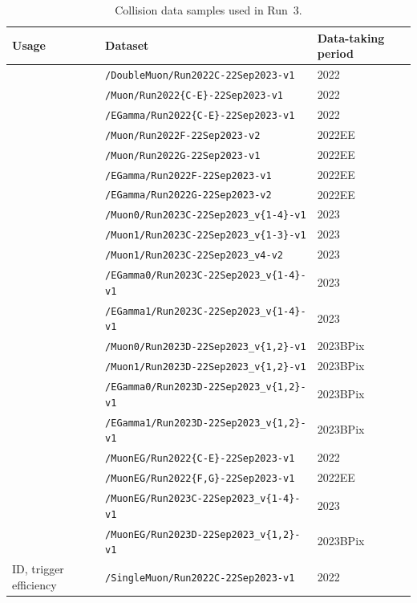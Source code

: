 \begin{table}
\centering
\footnotesize
\caption{Collision data samples used in Run~3.}
\label{tab:app_datasets_run3}
\begin{tabular}{p{3.1cm}p{11.3cm}p{2.8cm}}
\hline\hline
Usage & Dataset & Data-taking period \\
\hline
{}
& \texttt{/DoubleMuon/Run2022C-22Sep2023-v1} & 2022 \\
& \texttt{/Muon/Run2022\{C-E\}-22Sep2023-v1} & 2022 \\
& \texttt{/EGamma/Run2022\{C-E\}-22Sep2023-v1} & 2022 \\
& \texttt{/Muon/Run2022F-22Sep2023-v2} & 2022EE \\
& \texttt{/Muon/Run2022G-22Sep2023-v1} & 2022EE \\
& \texttt{/EGamma/Run2022F-22Sep2023-v1} & 2022EE \\
& \texttt{/EGamma/Run2022G-22Sep2023-v2} & 2022EE \\
& \texttt{/Muon0/Run2023C-22Sep2023\_v\{1-4\}-v1} & 2023 \\
& \texttt{/Muon1/Run2023C-22Sep2023\_v\{1-3\}-v1} & 2023 \\
& \texttt{/Muon1/Run2023C-22Sep2023\_v4-v2} & 2023 \\
& \texttt{/EGamma0/Run2023C-22Sep2023\_v\{1-4\}-v1} & 2023 \\
& \texttt{/EGamma1/Run2023C-22Sep2023\_v\{1-4\}-v1} & 2023 \\
& \texttt{/Muon0/Run2023D-22Sep2023\_v\{1,2\}-v1} & 2023BPix \\
& \texttt{/Muon1/Run2023D-22Sep2023\_v\{1,2\}-v1} & 2023BPix \\
& \texttt{/EGamma0/Run2023D-22Sep2023\_v\{1,2\}-v1} & 2023BPix \\
& \texttt{/EGamma1/Run2023D-22Sep2023\_v\{1,2\}-v1} & 2023BPix \\
\hline
{}
& \texttt{/MuonEG/Run2022\{C-E\}-22Sep2023-v1} & 2022 \\
& \texttt{/MuonEG/Run2022\{F,G\}-22Sep2023-v1} & 2022EE \\
& \texttt{/MuonEG/Run2023C-22Sep2023\_v\{1-4\}-v1} & 2023 \\
& \texttt{/MuonEG/Run2023D-22Sep2023\_v\{1,2\}-v1} & 2023BPix \\
\hline
ID, trigger efficiency
& \texttt{/SingleMuon/Run2022C-22Sep2023-v1} & 2022 \\
\hline\hline
\end{tabular}
\end{table}

